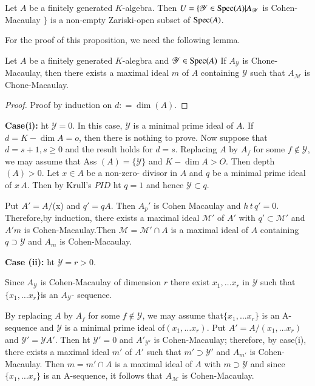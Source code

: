 \setcounter{proposition}{43}
\begin{proposition}\label{chap1:sec4:prop1.44}
  Let $A$ be a finitely generated $K$-algebra. Then $U = \{
  \mathscr{Y} \in \operatorname{Spec}  (A) |A_{\mathscr{Y}}$ is
  Cohen-Macaulay $\}$ is a non-empty Zariski-open subset of  $\operatorname{Spec}
  (A)$. 
\end{proposition}

For the proof of this proposition, we need the following lemma. 

\setcounter{lemma}{44}
\begin{lemma}\label{chap1:sec4:lem1.45}
  Let $A$ be a finitely generated $K$-alegbra and $\mathscr{Y} \in
  \operatorname{Spec} (A)$ If $A_{\mathscr{Y}}$ is Chone-Macaulay, then there
  exists a maximal ideal $m$ of $A$ containing $\mathscr{Y}$ such that
  $A_\mathscr{M}$ is Chone-Macaulay. 
\end{lemma}

\begin{proof}
  Proof by induction on $d:  = \dim (A)$.
\end{proof}

\noindent \textbf{Case(i):} ht $\mathscr{Y} = 0$. In this case, $\mathscr{Y}$ is a
  minimal prime ideal of $A$. If $d = K- \dim A = o$, then there is
  nothing to prove. Now suppose that $d= s+1, s \geq 0$ and the result
  holds for $d = s$. Replacing $A$ by $A_f$ for some $f \notin
  \mathscr{Y}$, we may assume that Ass $(A) = \{ \mathscr{Y} \}$ and
  $K-\dim A> O$. Then depth $(A) > 0$. Let $x \in A$ be a non-zero-
  divisor in $A$ and $q$ be a minimal prime ideal of $x\, A$. Then by
  Krull's $PID$ ht $q = 1$ and hence $\mathscr{Y} \subset q$. 

  Put $A' = A/$(x) and $q' = qA$. Then $A_p'$ is Cohen Macaulay and
  $h\,t\, q' = 0$. Therefore,by induction, there exists a maximal ideal
  $\mathscr{M'}$ of $A'$ with $q' \subset \mathscr{M'}$ and $A'm$ is
  Cohen-Macaulay.\pageoriginale Then $\mathscr{M}=\mathscr{M'} \cap A$ is a maximal
  ideal of $A$ containing $q \supset \mathscr{Y}$ and $A_m$ is
  Cohen-Macaulay. 

\noindent \textbf{Case (ii):} ht $\mathscr{Y} = r > 0$.


Since $A_{\mathscr{Y}}$ is Cohen-Macaulay of dimension $r$ there exist
$x_1,  \ldots x_r$ in $\mathscr{Y}$ such that $\{ x_1,  \ldots x_r \}
$is an $A_{\mathscr{Y}}$- sequence. 

By replacing $A$ by $A_f$ for some $f \notin\mathscr{Y}$, we may
assume that\break $\{ x_1,  \ldots x_r \}$ is an A-sequence and
$\mathscr{Y}$ is a minimal prime ideal of\break $(x_1,  \ldots x_r)$. Put
$A' = A/ (x_1,  \ldots x_r)$ and $\mathscr{Y}' = \mathscr{Y} A'$. Then
ht $\mathscr{Y}' =0$ and $A'_{\mathscr{Y}'}$ is Cohen-Macaulay; therefore,
by case(i), there exists a maximal ideal $m'$ of $A'$ such that $m'
\supset \mathscr{Y}'$ and $A_{m'}$ is Cohen-Macaulay. Then $m = m'
\cap A$ is a maximal ideal of $A$ with $m \supset \mathscr{Y}$ and
since $\{ x_1,  \ldots x_r \} $ is an A-sequence, it follows that
$A_\mathscr{M}$ is Cohen-Macaulay. 

